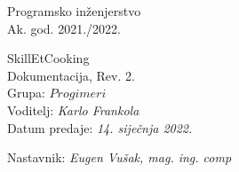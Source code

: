 \documentclass[12pt]{report}
\begin{document}
\begin{titlepage}
	\begin{center}
		\LARGE Programsko inženjerstvo\\
		\large Ak. god. 2021./2022.\\


		\huge SkillEtCooking\\
		\Large Dokumentacija, Rev. 2.\\

		\normalsize
		Grupa: \textit{$Progimeri$}\\
		Voditelj: \textit{Karlo Frankola}\\


		Datum predaje: \textit{14. siječnja 2022.}\\


		Nastavnik: \textit{Eugen Vušak, mag. ing. comp}\\

	\end{center}


\end{titlepage}


\tableofcontents











\begingroup
\renewcommand*\listfigurename{Indeks slika i dijagrama}
\listoffigures
\endgroup
{}



\eject


\end{document}
